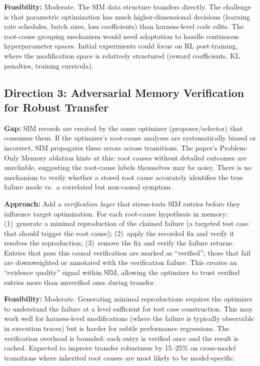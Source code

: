 \documentclass[11pt,a4paper]{article}
\begin{document}
\textbf{Feasibility:} Moderate. The SIM data structure transfers directly. The challenge is that parametric optimization has much higher-dimensional decisions (learning rate schedules, batch sizes, loss coefficients) than harness-level code edits. The root-cause grouping mechanism would need adaptation to handle continuous hyperparameter spaces. Initial experiments could focus on RL post-training, where the modification space is relatively structured (reward coefficients, KL penalties, training curricula).

\subsection{Direction 3: Adversarial Memory Verification for Robust Transfer}
\textbf{Gap:} SIM records are created by the same optimizer (proposer/selector) that consumes them. If the optimizer's root-cause analyses are systematically biased or incorrect, SIM propagates these errors across transitions. The paper's Problem-Only Memory ablation hints at this: root causes without detailed outcomes are unreliable, suggesting the root-cause labels themselves may be noisy. There is no mechanism to verify whether a stored root cause accurately identifies the true failure mode vs.\ a correlated but non-causal symptom.

\textbf{Approach:} Add a \emph{verification layer} that stress-tests SIM entries before they influence target optimization. For each root-cause hypothesis in memory: (1)~generate a minimal reproduction of the claimed failure (a targeted test case that should trigger the root cause); (2)~apply the recorded fix and verify it resolves the reproduction; (3)~remove the fix and verify the failure returns. Entries that pass this causal verification are marked as ``verified''; those that fail are downweighted or annotated with the verification failure. This creates an ``evidence quality'' signal within SIM, allowing the optimizer to trust verified entries more than unverified ones during transfer.

\textbf{Feasibility:} Moderate. Generating minimal reproductions requires the optimizer to understand the failure at a level sufficient for test case construction. This may work well for harness-level modifications (where the failure is typically observable in execution traces) but is harder for subtle performance regressions. The verification overhead is bounded: each entry is verified once and the result is cached. Expected to improve transfer robustness by 15--25\% on cross-model transitions where inherited root causes are most likely to be model-specific.
\end{document}
